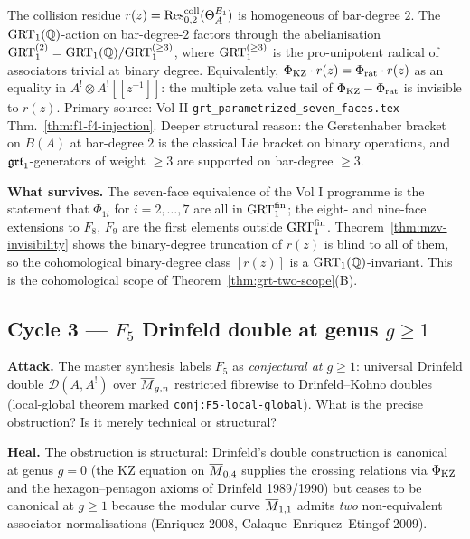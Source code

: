 \begin{theorem}\ClaimStatusTheorem
\label{thm:mzv-invisibility}
The collision residue $r(z) = \operatorname{Res}^{\mathrm{coll}}_{0,2}(\Theta_A^{E_1})$ is
homogeneous of bar-degree $2$. The $\mathrm{GRT}_1(\mathbb{Q})$-action on bar-degree-$2$
factors through the abelianisation
$\mathrm{GRT}_1^{(2)} = \mathrm{GRT}_1(\mathbb{Q})/\mathrm{GRT}_1^{(\ge 3)}$, where $\mathrm{GRT}_1^{(\ge 3)}$ is the
pro-unipotent radical of associators trivial at binary degree.
Equivalently, $\Phi_{\mathrm{KZ}} \cdot r(z) = \Phi_{\mathrm{rat}} \cdot r(z)$
as an equality in $A^! \otimes A^! [[z^{-1}]]$: the multiple zeta value
tail of $\Phi_{\mathrm{KZ}} - \Phi_{\mathrm{rat}}$ is invisible to $r(z)$.
Primary source: Vol II \texttt{grt\_parametrized\_seven\_faces.tex}
Thm.~\ref{thm:f1-f4-injection}. Deeper structural reason: the
Gerstenhaber bracket on $B(A)$ at bar-degree $2$ is the classical Lie
bracket on binary operations, and $\mathfrak{grt}_1$-generators of weight $\ge 3$
are supported on bar-degree $\ge 3$.
\end{theorem}

\textbf{What survives.} The seven-face equivalence of the Vol I
programme is the statement that $\Phi_{1i}$ for $i = 2, \dots, 7$ are
all in $\mathrm{GRT}_1^{\mathrm{fin}}$; the eight- and nine-face extensions to
$F_8$, $F_9$ are the first elements outside $\mathrm{GRT}_1^{\mathrm{fin}}$.
Theorem~\ref{thm:mzv-invisibility} shows the binary-degree truncation
of $r(z)$ is blind to all of them, so the cohomological binary-degree
class $[r(z)]$ is a $\mathrm{GRT}_1(\mathbb{Q})$-invariant. This is the cohomological
scope of Theorem~\ref{thm:grt-two-scope}(B).

\subsection*{Cycle 3 --- $F_5$ Drinfeld double at genus $g \ge 1$}

\textbf{Attack.} The master synthesis labels $F_5$ as
\emph{conjectural at $g \ge 1$}: universal Drinfeld double
$\mathcal{D}(A, A^!)$ over $\overline{M}_{g,n}$ restricted fibrewise to
Drinfeld--Kohno doubles (local-global theorem marked
\texttt{conj:F5-local-global}). What is the precise obstruction?
Is it merely technical or structural?

\textbf{Heal.} The obstruction is structural: Drinfeld's double
construction is canonical at genus $g = 0$ (the KZ equation on
$\overline{M}_{0,4}$ supplies the crossing relations via $\Phi_{\mathrm{KZ}}$ and
the hexagon--pentagon axioms of Drinfeld 1989/1990) but ceases to be
canonical at $g \ge 1$ because the modular curve $\overline{M}_{1,1}$
admits \emph{two} non-equivalent associator normalisations
(Enriquez 2008, Calaque--Enriquez--Etingof 2009).

